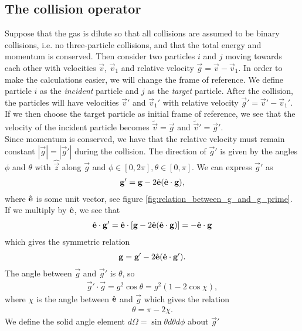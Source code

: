\subsection{The collision operator}
Suppose that the gas is dilute so that all collisions are assumed to be binary collisions, i.e. no three-particle collisions, and that the total energy and momentum is conserved. Then consider two particles $i$ and $j$ moving towards each other with velocities $\vec v$, $\vec v_1$ and relative velocity $\vec g = \vec v - \vec v_1$. In order to make the calculations easier, we will change the frame of reference. We define particle $i$ as the \textit{incident} particle and $j$ as the \textit{target} particle. After the collision, the particles will have velocities $\vec v'$ and $\vec v_1'$ with relative velocity $\vec g' = \vec v' - \vec v_1'$. If we then choose the target particle as initial frame of reference, we see that the velocity of the incident particle becomes $\tilde {\vec v} = \vec g$ and $\tilde {\vec v}' = \vec g'$.\\
Since momentum is conserved, we have that the relative velocity must remain constant $|\vec g| = |\vec g'|$ during the collision. The direction of $\vec g'$ is given by the angles $\phi$ and $\theta$ with $\hat {\vec z}$ along $\vec g$ and $\phi \in [0, 2\pi], \theta \in [0, \pi]$. We can express $\vec g'$ as
\begin{align}
	\mathbf g' = \mathbf g - 2\hat {\mathbf{e}}(\hat {\mathbf{e}}\cdot\mathbf g),
\end{align}
where $\hat {\mathbf{e}}$ is some unit vector, see figure \ref{fig:relation_between_g_and_g_prime}. If we multiply by $\hat {\mathbf{e}}$, we see that 
\begin{align}
	\hat {\mathbf{e}}\cdot \mathbf g' = \hat {\mathbf{e}}\cdot\left[\mathbf g - 2\hat {\mathbf{e}}(\hat {\mathbf{e}}\cdot\mathbf g)\right] = -\hat {\mathbf{e}} \cdot \mathbf g
\end{align}
which gives the symmetric relation
\begin{align}
	\mathbf g = \mathbf g' - 2\hat {\mathbf{e}}(\hat {\mathbf{e}}\cdot\mathbf g').
\end{align}
The angle between $\vec g$ and $\vec g'$ is $\theta$, so
\begin{align}
	\vec g'\cdot \vec g = g^2\cos\theta = g^2(1 - 2\cos \chi),
\end{align}
where $\chi$ is the angle between $\hat {\mathbf{e}}$ and $\vec g$ which gives the relation
\begin{align}
	\theta = \pi - 2\chi.
\end{align}
We define the solid angle element $d\Omega=\sin\theta d\theta d\phi$ about $\vec g'$ 
